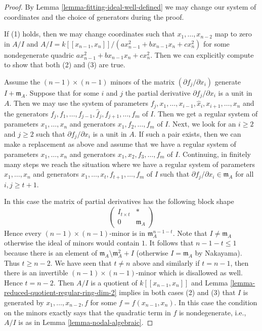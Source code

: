 \documentclass[10pt,a4paper]{amsart}
\theoremstyle{plain}
\theoremstyle{definition}
\theoremstyle{remark}
\numberwithin{equation}{subsection}
\begin{document}
\begin{proof}
By Lemma \ref{lemma-fitting-ideal-well-defined}
we may change our system of coordinates and the
choice of generators during the proof.

\medskip\noindent
If (1) holds, then we may change coordinates such that
$x_1, \ldots, x_{n - 2}$ map to zero in $A/I$ and
$A/I = k[[x_{n - 1}, x_n]]/(a x_{n - 1}^2 + b x_{n - 1}x_n + c x_n^2)$
for some nondegenerate quadric $a x_{n - 1}^2 + b x_{n - 1}x_n + c x_n^2$.
Then we can explicitly compute to show that both (2) and (3) are true.

\medskip\noindent
Assume the $(n - 1) \times (n - 1)$ minors of the matrix
$(\partial f_j/\partial x_i)$ generate $I + \mathfrak m_A$.
Suppose that for some $i$ and $j$ the partial derivative
$\partial f_j/\partial x_i$ is a unit in $A$. Then
we may use the system of parameters
$f_j, x_1, \ldots, x_{i - 1}, \hat x_i, x_{i + 1}, \ldots, x_n$
and the generators
$f_j, f_1, \ldots, f_{j - 1}, \hat f_j, f_{j + 1}, \ldots, f_m$
of $I$. Then we get a regular system of parameters $x_1, \ldots, x_n$
and generators $x_1, f_2, \ldots, f_m$ of $I$.
Next, we look for an $i \geq 2$ and $j \geq 2$ such that
$\partial f_j/\partial x_i$ is a unit in $A$. If such a pair
exists, then we can make a replacement as above and assume
that we have a regular system of parameters
$x_1, \ldots, x_n$ and generators $x_1, x_2, f_3, \ldots, f_m$ of $I$.
Continuing, in finitely many steps we reach the situation where
we have a regular system of parameters
$x_1, \ldots, x_n$ and generators
$x_1, \ldots, x_t, f_{t + 1}, \ldots, f_m$ of $I$
such that $\partial f_j/\partial x_i \in \mathfrak m_A$
for all $i, j \geq t + 1$.

\medskip\noindent
In this case the matrix of partial derivatives has the following
block shape
$$
\left(
\begin{matrix}
I_{t \times t} & * \\
0 & \mathfrak m_A
\end{matrix}
\right)
$$
Hence every $(n - 1) \times (n - 1)$-minor is in $\mathfrak m_A^{n - 1 - t}$.
Note that $I \not = \mathfrak m_A$ otherwise the ideal of minors
would contain $1$. It follows that $n - 1 - t \leq 1$ because there
is an element of $\mathfrak m_A \setminus \mathfrak m_A^2 + I$ (otherwise
$I = \mathfrak m_A$ by Nakayama). Thus $t \geq n - 2$.
We have seen that $t \not = n$ above and similarly if
$t = n - 1$, then there is an invertible $(n - 1) \times (n - 1)$-minor
which is disallowed as well. Hence $t = n - 2$.
Then $A/I$ is a quotient of $k[[x_{n - 1}, x_n]]$ and
Lemma \ref{lemma-reduced-quotient-regular-ring-dim-2}
implies in both cases (2) and (3) that $I$ is generated by
$x_1, \ldots, x_{n - 2}, f$ for some $f = f(x_{n - 1}, x_n)$.
In this case the condition on the minors exactly says that the quadratic
term in $f$ is nondegenerate, i.e., $A/I$ is as in
Lemma \ref{lemma-nodal-algebraic}.
\end{proof}
\end{document}
